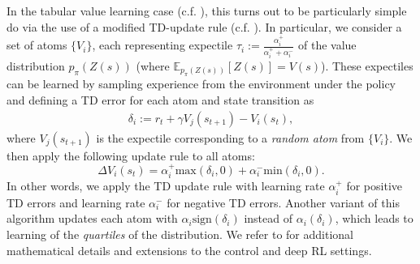In the tabular value learning case (c.f. ), this turns out to be particularly simple do via the use of a modified TD-update rule (c.f. ).
In particular, we consider a set of atoms $\{ V_i \}$, each representing expectile $\tau_i := \frac{\alpha_i^+}{\alpha_i^+ + \alpha_i^-}$ of the value distribution $p_\pi(Z(s))$ (where $\mathbb{E}_{ p_\pi(Z(s))} \left [ Z(s) \right ] = V(s)$).
These expectiles can be learned by sampling experience from the environment under the policy and defining a TD error for each atom and state transition as
\begin{align}
    \delta_i := r_t + \gamma V_j(s_{t+1}) - V_i(s_t),
\end{align}
where $V_j(s_{t+1})$ is the expectile corresponding to a \emph{random atom} from  $\{ V_i \}$.
We then apply the following update rule to all atoms:
\begin{equation}
    \label{eq:DRL_V_expec}
    \Delta V_i(s_t) = \alpha_i^+ \text{max}(\delta_i, 0 ) + \alpha_i^- \text{min}(\delta_i, 0).
\end{equation}
In other words, we apply the TD update rule with learning rate $\alpha_i^+$ for positive TD errors and learning rate $\alpha_i^-$ for negative TD errors.
Another variant of this algorithm updates each atom with $\alpha_i \text{sign}(\delta_i)$ instead of $\alpha_i (\delta_i)$, which leads to learning of the \emph{quartiles} of the distribution.
We refer to \citet{bellemare2017distributional,dabney2018distributional,rowland2019statistics,bellemare2023distributional,dabney2020distributional} for additional mathematical details and extensions to the control and deep RL settings.

